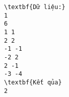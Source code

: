 \begin{verbatim}
\textbf{Dữ liệu:} 
1
6
1 1
2 2
-1 -1
-2 2
2 -1
-3 -4
\textbf{Kết qủa} 
2 
\end{verbatim}